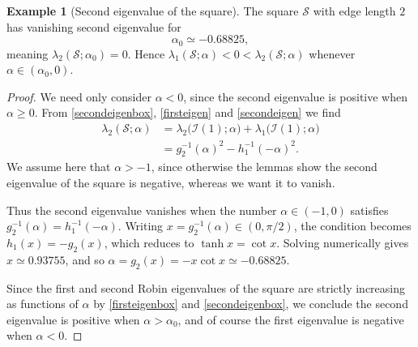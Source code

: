\documentclass[12pt,reqno]{amsart}
\theoremstyle{definition}
\newtheorem{example}[example]{Example}
\begin{document}
\begin{example}[Second eigenvalue of the square] \label{squareexample}
The square $\mathcal{S}$ with edge length $2$ has vanishing second eigenvalue for   
\[
\alpha_0 \simeq -0.68825 , 
\]
meaning $\lambda_2(\mathcal{S};\alpha_0) = 0$. Hence $\lambda_1(\mathcal{S};\alpha) < 0 < \lambda_2(\mathcal{S};\alpha)$ whenever $\alpha \in (\alpha_0,0)$.
%
\begin{proof}
We need only consider $\alpha<0$, since the second eigenvalue is positive when $\alpha \geq 0$.  From \autoref{secondeigenbox}, \autoref{firsteigen} and \autoref{secondeigen} we find
%
\begin{align*}
\lambda_2(\mathcal{S};\alpha)
& = \lambda_2\big( \mathcal{I}(1) ; \alpha \big) + \lambda_1\big( \mathcal{I}(1) ; \alpha \big) \\
& = g_2^{-1}(\alpha)^2 - h_1^{-1}(-\alpha)^2 .
\end{align*}
%
We assume here that $\alpha> -1$, since otherwise the lemmas show the second eigenvalue of the square is negative, whereas we want it to vanish. 

Thus the second eigenvalue vanishes when the number $\alpha \in (-1,0)$ satisfies $g_2^{-1}(\alpha) = h_1^{-1}(-\alpha)$. Writing $x=g_2^{-1}(\alpha) \in (0,\pi/2)$, the condition becomes $h_1(x)=-g_2(x)$, which reduces to $\tanh x = \cot x$. Solving numerically gives $x \simeq 0.93755$, and so $\alpha= g_2(x) = -x \cot x \simeq -0.68825$. 

Since the first and second Robin eigenvalues of the square are strictly increasing as functions of $\alpha$ by \autoref{firsteigenbox} and \autoref{secondeigenbox}, we conclude the second eigenvalue is positive when $\alpha > \alpha_0$, and of course the first eigenvalue is negative when $\alpha<0$. 
\end{proof}
%
\end{example}
%
\end{document}
